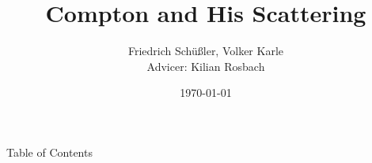 \documentclass[xcolor=x11names,compress]{beamer}
\renewcommand{\(}{\begin{columns}}
\renewcommand{\)}{\end{columns}}
\newcommand{\<}[1]{\begin{column}{#1}}
\renewcommand{\>}{\end{column}}
\begin{document}
\begin{frame}
\title{Compton and His Scattering}
\author{
	Friedrich Schüßler, Volker Karle\\
    \begin{equation*}
       \qquad 
    \end{equation*}
    Advicer: Kilian Rosbach
}
\date{
	\today
}
\titlepage
\end{frame}

\begin{frame}{Table of Contents}
\tableofcontents
\end{frame}
\end{document}
